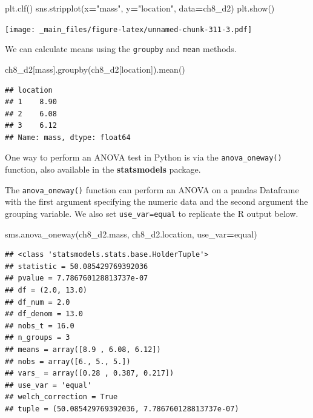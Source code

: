 \documentclass[
]{book}
\newenvironment{Shaded}{\begin{snugshade}}{\end{snugshade}}
\newcommand{\NormalTok}[1]{#1}
\newcommand{\OperatorTok}[1]{\textcolor[rgb]{0.81,0.36,0.00}{\textbf{#1}}}
\newcommand{\StringTok}[1]{\textcolor[rgb]{0.31,0.60,0.02}{#1}}
\begin{document}
\begin{Shaded}
\begin{Highlighting}[]
\NormalTok{plt.clf()}
\NormalTok{sns.stripplot(x}\OperatorTok{=}\StringTok{"mass"}\NormalTok{, y}\OperatorTok{=}\StringTok{"location"}\NormalTok{, data}\OperatorTok{=}\NormalTok{ch8\_d2)}
\NormalTok{plt.show()}
\end{Highlighting}
\end{Shaded}

\texttt{[image: \_main\_files/figure-latex/unnamed-chunk-311-3.pdf]}

We can calculate means using the \texttt{groupby} and \texttt{mean} methods.

\begin{Shaded}
\begin{Highlighting}[]
\NormalTok{ch8\_d2[}\StringTok{\textquotesingle{}mass\textquotesingle{}}\NormalTok{].groupby(ch8\_d2[}\StringTok{\textquotesingle{}location\textquotesingle{}}\NormalTok{]).mean()}
\end{Highlighting}
\end{Shaded}

\begin{verbatim}
## location
## 1    8.90
## 2    6.08
## 3    6.12
## Name: mass, dtype: float64
\end{verbatim}

One way to perform an ANOVA test in Python is via the \texttt{anova\_oneway()} function, also available in the \textbf{statsmodels} package.

The \texttt{anova\_oneway()} function can perform an ANOVA on a pandas Dataframe with the first argument specifying the numeric data and the second argument the grouping variable. We also set \texttt{use\_var=\textquotesingle{}equal\textquotesingle{}} to replicate the R output below.

\begin{Shaded}
\begin{Highlighting}[]
\NormalTok{sms.anova\_oneway(ch8\_d2.mass, ch8\_d2.location, use\_var}\OperatorTok{=}\StringTok{\textquotesingle{}equal\textquotesingle{}}\NormalTok{)}
\end{Highlighting}
\end{Shaded}

\begin{verbatim}
## <class 'statsmodels.stats.base.HolderTuple'>
## statistic = 50.085429769392036
## pvalue = 7.786760128813737e-07
## df = (2.0, 13.0)
## df_num = 2.0
## df_denom = 13.0
## nobs_t = 16.0
## n_groups = 3
## means = array([8.9 , 6.08, 6.12])
## nobs = array([6., 5., 5.])
## vars_ = array([0.28 , 0.387, 0.217])
## use_var = 'equal'
## welch_correction = True
## tuple = (50.085429769392036, 7.786760128813737e-07)
\end{verbatim}
\end{document}
